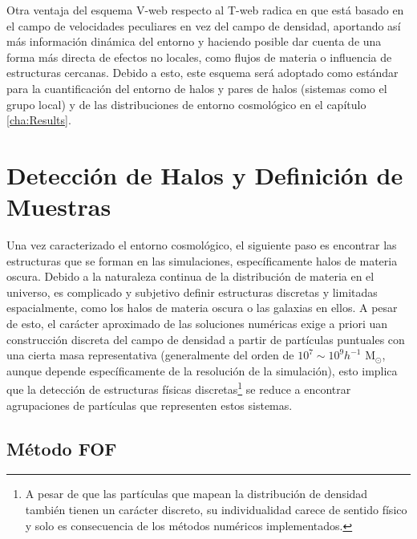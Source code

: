 Otra ventaja del esquema V-web respecto al T-web radica en que está basado 
en el campo de velocidades peculiares en vez del campo de densidad, aportando 
así más información dinámica del entorno y haciendo posible dar cuenta de una
forma más directa de efectos no locales, como flujos de materia o influencia 
de estructuras cercanas. Debido a esto, este esquema será adoptado como 
estándar para la cuantificación del entorno de halos y pares de halos 
(sistemas como el grupo local) y de las distribuciones de entorno 
cosmológico en el capítulo \ref{cha:Results}.






\section{Detección de Halos y Definición de Muestras}
\label{sec:HalosDetectionAndSampleDefinitions}


Una vez caracterizado el entorno cosmológico, el siguiente paso es encontrar 
las estructuras que se forman en las simulaciones, específicamente halos de 
materia oscura. Debido a la naturaleza continua de la distribución de materia 
en el universo, es complicado y subjetivo definir estructuras discretas y 
limitadas espacialmente, como los halos de materia oscura o las galaxias en 
ellos. A pesar de esto, el carácter aproximado de las soluciones numéricas 
exige a priori uan construcción discreta del campo de densidad a partir de 
partículas puntuales con una cierta masa representativa (generalmente del 
orden de $10^7 \sim 10^9 h^{-1}$ M$_{\odot}$, aunque depende específicamente 
de la resolución de la simulación), esto implica que la detección de 
estructuras físicas discretas\footnote{A pesar de que las partículas que 
mapean la distribución de densidad también tienen un carácter discreto, su 
individualidad carece de sentido físico y solo es consecuencia de los 
métodos numéricos implementados.} se reduce a encontrar agrupaciones de 
partículas que representen estos sistemas.


	\subsection{Método FOF}
	\label{subsec:FOFMethod}
	

